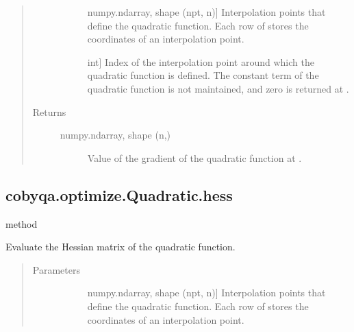 \documentclass[letterpaper,10pt,english]{sphinxmanual}
\begin{document}
\begin{fulllineitems}
\begin{fulllineitems}
\begin{quote}
\begin{description}
\begin{description}
\item[{}] \leavevmode{[}numpy.ndarray, shape (npt, n){]}
\sphinxAtStartPar
Interpolation points that define the quadratic function. Each row of
 stores the coordinates of an interpolation point.

\item[{}] \leavevmode{[}int{]}
\sphinxAtStartPar
Index of the interpolation point around which the quadratic function
is defined. The constant term of the quadratic function is not
maintained, and zero is returned at .

\end{description}

\item[{Returns}] \leavevmode\begin{description}
\item[{numpy.ndarray, shape (n,)}] \leavevmode
\sphinxAtStartPar
Value of the gradient of the quadratic function at .

\end{description}

\end{description}\end{quote}

\end{fulllineitems}



\subsection{cobyqa.optimize.Quadratic.hess}
\label{\detokenize{refs/generated/cobyqa.optimize.Quadratic.hess:cobyqa-optimize-quadratic-hess}}\label{\detokenize{refs/generated/cobyqa.optimize.Quadratic.hess::doc}}
\sphinxAtStartPar
method

\begin{fulllineitems}
\label{\detokenize{refs/generated/cobyqa.optimize.Quadratic.hess:cobyqa.optimize.Quadratic.hess}}
\sphinxAtStartPar
Evaluate the Hessian matrix of the quadratic function.
\begin{quote}\begin{description}
\item[{Parameters}] \leavevmode\begin{description}
\item[{}] \leavevmode{[}numpy.ndarray, shape (npt, n){]}
\sphinxAtStartPar
Interpolation points that define the quadratic function. Each row of
 stores the coordinates of an interpolation point.


\end{description}
\end{description}
\end{quote}
\end{fulllineitems}
\end{fulllineitems}
\end{document}
